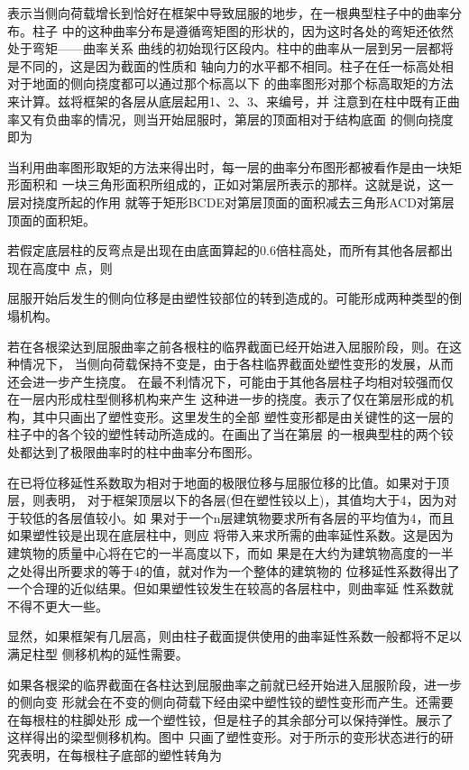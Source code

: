 \documentclass[12pt,a4paper]{book}
\begin{document}
表示当侧向荷载增长到恰好在框架中导致屈服的地步，在一根典型柱子中的曲率分布。柱子
中的这种曲率分布是遵循弯矩图的形状的，因为这时各处的弯矩还依然处于弯矩——曲率关系
曲线的初始现行区段内。柱中的曲率从一层到另一层都将是不同的，这是因为截面的性质和
轴向力的水平都不相同。柱子在任一标高处相对于地面的侧向挠度都可以通过那个标高以下
的曲率图形对那个标高取矩的方法来计算。兹将框架的各层从底层起用1、2、3、来编号，并
注意到在柱中既有正曲率又有负曲率的情况，则当开始屈服时，第层的顶面相对于结构底面
的侧向挠度即为

当利用曲率图形取矩的方法来得出时，每一层的曲率分布图形都被看作是由一块矩形面积和
一块三角形面积所组成的，正如对第层所表示的那样。这就是说，这一层对挠度所起的作用
就等于矩形BCDE对第层顶面的面积减去三角形ACD对第层顶面的面积矩。

若假定底层柱的反弯点是出现在由底面算起的0.6倍柱高处，而所有其他各层都出现在高度中
点，则

屈服开始后发生的侧向位移是由塑性铰部位的转到造成的。可能形成两种类型的倒塌机构。

若在各根梁达到屈服曲率之前各根柱的临界截面已经开始进入屈服阶段，则。在这种情况下，
当侧向荷载保持不变是，由于各柱临界截面处塑性变形的发展，从而还会进一步产生挠度。
在最不利情况下，可能由于其他各层柱子均相对较强而仅在一层内形成柱型侧移机构来产生
这种进一步的挠度。表示了仅在第层形成的机构，其中只画出了塑性变形。这里发生的全部
塑性变形都是由关键性的这一层的柱子中的各个铰的塑性转动所造成的。在画出了当在第层
的一根典型柱的两个铰处都达到了极限曲率时的柱中曲率分布图形。


在已将位移延性系数取为相对于地面的极限位移与屈服位移的比值。如果对于顶层，则表明，
对于框架顶层以下的各层(但在塑性铰以上)，其值均大于4，因为对于较低的各层值较小。如
果对于一个n层建筑物要求所有各层的平均值为4，而且如果塑性铰是出现在底层柱中，则应
将带入来求所需的曲率延性系数。这是因为建筑物的质量中心将在它的一半高度以下，而如
果是在大约为建筑物高度的一半之处得出所要求的等于4的值，就对作为一个整体的建筑物的
位移延性系数得出了一个合理的近似结果。但如果塑性铰发生在较高的各层柱中，则曲率延
性系数就不得不更大一些。

显然，如果框架有几层高，则由柱子截面提供使用的曲率延性系数一般都将不足以满足柱型
侧移机构的延性需要。

如果各根梁的临界截面在各柱达到屈服曲率之前就已经开始进入屈服阶段，进一步的侧向变
形就会在不变的侧向荷载下经由梁中塑性铰的塑性变形而产生。还需要在每根柱的柱脚处形
成一个塑性铰，但是柱子的其余部分可以保持弹性。展示了这样得出的梁型侧移机构。图中
只画了塑性变形。对于所示的变形状态进行的研究表明，在每根柱子底部的塑性转角为
\end{document}
